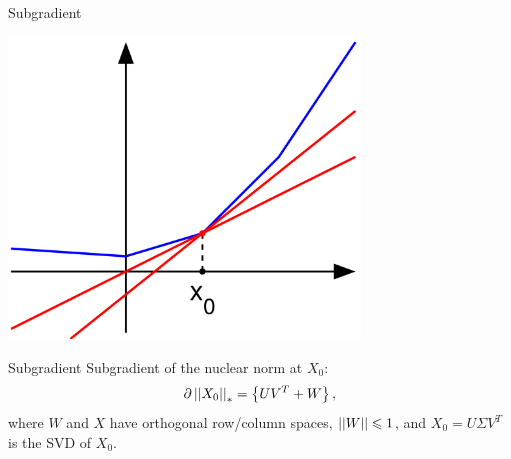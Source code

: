 \documentclass{beamer}
\begin{document}
\begin{frame}{Subgradient}
    \begin{center}
        \includegraphics[width=0.7\textwidth]{img/Subderivative_illustration.png}
    \end{center}
\end{frame}

\begin{frame}{Subgradient}
    Subgradient of the nuclear norm at \(X_0\):
    \[\partial\left|\left|X_0\right|\right|_\ast=\left\{UV^T+W\right\},\]
    where \(W\) and \(X\) have orthogonal row/column spaces, \(\left|\left|W\right|\right|\leqslant 1\), and \(X_0=U\Sigma V^T\) is the SVD of \(X_0\).
\end{frame}
\end{document}
